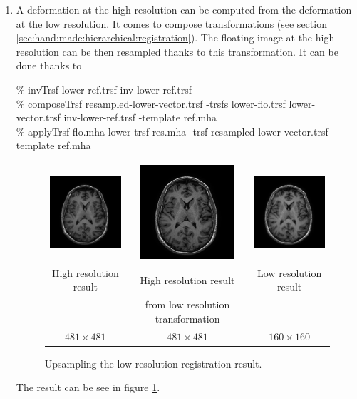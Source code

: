 \begin{enumerate}
\item A deformation at the high resolution can be computed from the deformation at the low resolution. It comes to compose transformations (see section \ref{sec:hand:made:hierarchical:registration}). The floating image at the high resolution can be then resampled thanks to this transformation. It can be done thanks to
\begin{code}{1}
\% invTrsf lower-ref.trsf inv-lower-ref.trsf \\
\% composeTrsf resampled-lower-vector.trsf -trsfs lower-flo.trsf lower-vector.trsf inv-lower-ref.trsf -template ref.mha \\
\% applyTrsf flo.mha lower-trsf-res.mha -trsf resampled-lower-vector.trsf -template ref.mha
\end{code}
\begin{figure}[ht]
\begin{center}
\begin{tabular}{ccc}
\includegraphics[width=35mm]{use-examples/applyTrsf-blockmatching/res.png} &
\includegraphics[width=35mm]{use-examples/applyTrsf-blockmatching/lower-trsf-res.png} &
\includegraphics[width=35mm]{use-examples/applyTrsf-blockmatching/lower-res.png} \\
High resolution result &
High resolution result  &
Low resolution result \\
& from low resolution transformation & \\
$481 \times 481$ &
$481 \times 481$ &
$160 \times 160$
\end{tabular}
\end{center}
\caption{\label{fig:exe:applyTrsf:blockmatching:4} Upsampling the low resolution registration result.}
\end{figure}
The result can be see in figure \ref{fig:exe:applyTrsf:blockmatching:4}.

\end{enumerate}


